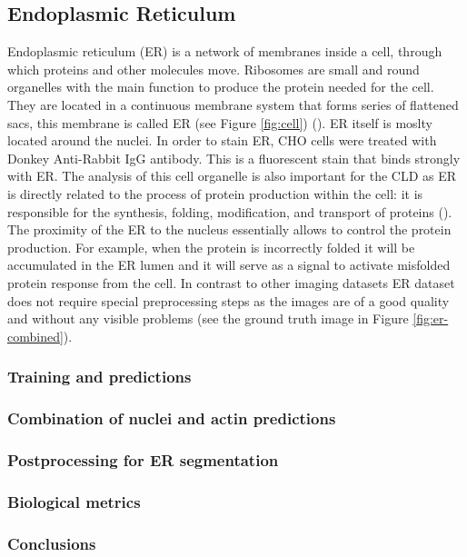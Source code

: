 \subsection{Endoplasmic Reticulum}
    \label{section:er}
    Endoplasmic reticulum (ER) is a network of membranes inside a cell, through which proteins and other molecules move. Ribosomes are small and round organelles with the main function to produce the protein needed for the cell. They are located in a continuous membrane system that forms series of flattened sacs, this membrane is called ER (see Figure \ref{fig:cell}) (\cite{er}). ER itself is moslty located around the nuclei. In order to stain ER, CHO cells were treated with Donkey Anti-Rabbit IgG antibody. This is a fluorescent stain that binds strongly with ER. The analysis of this cell organelle is also important for the CLD as ER is directly related to the process of protein production within the cell: it is responsible for the synthesis, folding, modification, and transport of proteins (\cite{er_2}). The proximity of the ER to the nucleus essentially allows to control the protein production. For example, when the protein is incorrectly folded it will be accumulated in the ER lumen and it will serve as a signal to activate misfolded protein response from the cell. In contrast to other imaging datasets ER dataset does not require special preprocessing steps as the images are of a good quality and without any visible problems (see the ground truth image in Figure \ref{fig:er-combined}).
    
    \subsubsection{Training and predictions}
        
    \subsubsection{Combination of nuclei and actin predictions}
        
    \subsubsection{Postprocessing for ER segmentation}
        
    \subsubsection{Biological metrics}
        
    \subsubsection{Conclusions}
        
    